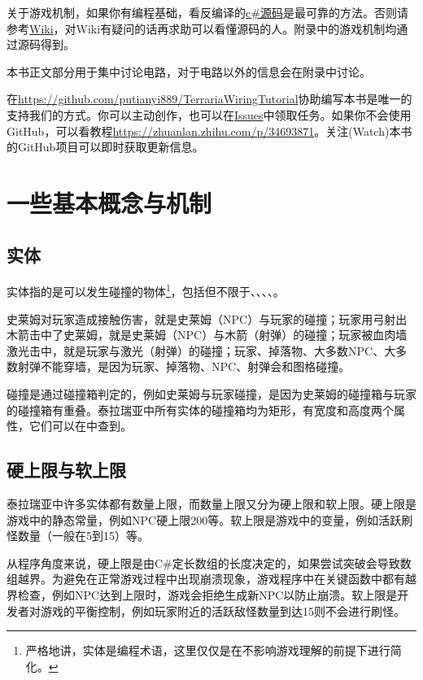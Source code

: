 关于游戏机制，如果你有编程基础，看反编译的\hyperref[app8]{c\#源码}是最可靠的方法。否则请参考\hyperref[app2]{Wiki}，对Wiki有疑问的话再求助可以看懂源码的人。附录中的游戏机制均通过源码得到。

本书正文部分用于集中讨论电路，对于电路以外的信息会在附录中讨论。

在\url{https://github.com/putianyi889/TerrariaWiringTutorial}协助编写本书是唯一的支持我们的方式。你可以主动创作，也可以在\href{https://github.com/putianyi889/TerrariaWiringTutorial/issues}{Issues}中领取任务。如果你不会使用GitHub，可以看教程\url{https://zhuanlan.zhihu.com/p/34693871}。关注(Watch)本书的GitHub项目可以即时获取更新信息。

\section{一些基本概念与机制}

\subsection{实体}
实体指的是可以发生碰撞的物体\footnote{严格地讲，实体是编程术语，这里仅仅是在不影响游戏理解的前提下进行简化。}，包括但不限于、、、、。

史莱姆对玩家造成接触伤害，就是史莱姆（NPC）与玩家的碰撞；玩家用弓射出木箭击中了史莱姆，就是史莱姆（NPC）与木箭（射弹）的碰撞；玩家被血肉墙激光击中，就是玩家与激光（射弹）的碰撞；玩家、掉落物、大多数NPC、大多数射弹不能穿墙，是因为玩家、掉落物、NPC、射弹会和图格碰撞。

碰撞是通过碰撞箱判定的，例如史莱姆与玩家碰撞，是因为史莱姆的碰撞箱与玩家的碰撞箱有重叠。泰拉瑞亚中所有实体的碰撞箱均为矩形，有宽度和高度两个属性，它们可以在中查到。

\subsection{硬上限与软上限}
泰拉瑞亚中许多实体都有数量上限，而数量上限又分为硬上限和软上限。硬上限是游戏中的静态常量，例如NPC硬上限200等。软上限是游戏中的变量，例如活跃刷怪数量（一般在5到15）等。

从程序角度来说，硬上限是由C\#定长数组的长度决定的，如果尝试突破会导致数组越界。为避免在正常游戏过程中出现崩溃现象，游戏程序中在关键函数中都有越界检查，例如NPC达到上限时，游戏会拒绝生成新NPC以防止崩溃。软上限是开发者对游戏的平衡控制，例如玩家附近的活跃敌怪数量到达15则不会进行刷怪。

